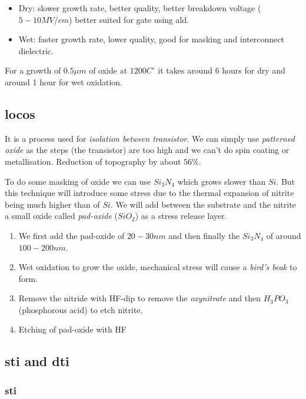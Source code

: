 \documentclass{report}
\begin{document}
\begin{itemize}
    \item Dry: slower growth rate, better quality, better breakdown voltage ($5-10MV/cm$) better suited for gate using \gls{ald}.
    \item Wet: faster growth rate, lower quality, good for masking and interconnect dielectric.
\end{itemize}

For a growth of $0.5\mu m$ of oxide at $1200 C^\circ$ it takes around 6 hours for dry and around 1 hour for wet oxidation.


\subsection{\gls{locos}}

It is a process used for \textit{isolation between transistor}. We can simply use \textit{patterned oxide} as the steps (the transistor) are too high and we can't do spin coating or metallisation. Reduction of topography by about $56\%$. 

To do some masking of oxide we can use $Si_3N_4$ which grows slower than $Si$. But this technique will introduce some stress due to the thermal expansion of nitrite being much higher than of $Si$. We will add between the substrate and the nitrite a small oxide called \textit{pad-oxide} ($SiO_2$) as a stress release layer.

\begin{enumerate}
    \item We first add the pad-oxide of $20-30nm$ and then finally the $Si_3N_4$ of around $100-200nm$. 
    \item Wet oxidation to grow the oxide, mechanical stress will cause a \textit{bird's beak} to form.
    \item Remove the nitride with HF-dip to remove the \textit{oxynitrate} and then $H_3PO_3$ (phosphorous acid) to etch nitrite.
    \item Etching of pad-oxide with HF
\end{enumerate}

\subsection{\gls{sti} and \gls{dti}}

\subsubsection{\gls{sti}}
\end{document}
